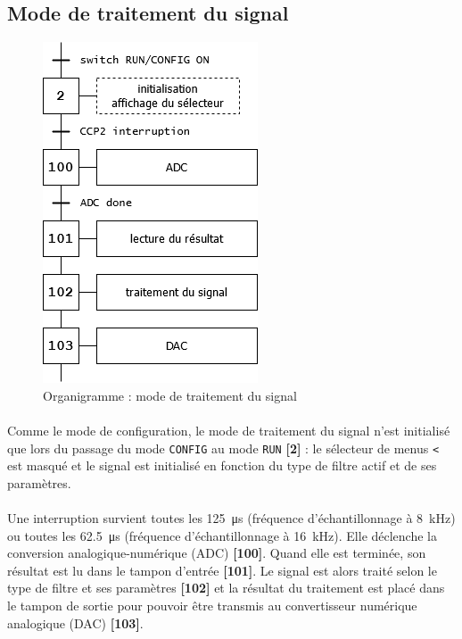 \documentclass{article}
\begin{document}
    \subsection{Mode de traitement du signal}
    \begin{figure}[H]
        \centering
        \includegraphics[width=.2\textwidth]{./images/orga_run.png}
        \caption{Organigramme : mode de traitement du signal}
    \end{figure}

    \paragraph{}
    Comme le mode de configuration, le mode de traitement du signal n'est initialisé que lors du passage du mode \texttt{CONFIG} au mode \texttt{RUN} \textbf{[2]} : le sélecteur de menus \texttt{<} est masqué et le signal est initialisé en fonction du type de filtre actif et de ses paramètres.

    \paragraph{}
    Une interruption survient toutes les \SI{125}{\micro\second} (fréquence d'échantillonnage à \SI{8}{\kilo\hertz}) ou toutes les \SI{62,5}{\micro\second} (fréquence d'échantillonnage à \SI{16}{\kilo\hertz}). Elle déclenche la conversion analogique-numérique (ADC) \textbf{[100]}. Quand elle est terminée, son résultat est lu dans le tampon d'entrée \textbf{[101]}. Le signal est alors traité selon le type de filtre et ses paramètres \textbf{[102]} et la résultat du traitement est placé dans le tampon de sortie pour pouvoir être transmis au convertisseur numérique analogique (DAC) \textbf{[103]}.








\end{document}
